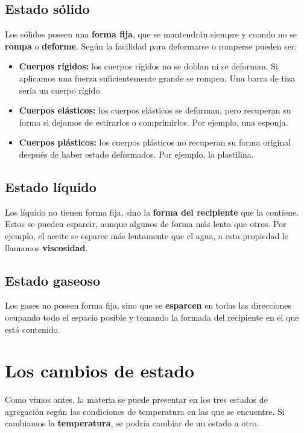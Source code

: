 \subsection{Estado sólido}

Los sólidos poseen una \textbf{forma fija}, que se mantendrán siempre y cuando no se \textbf{rompa} o \textbf{deforme}. Según la facilidad para deformarse o romperse pueden ser:

\begin{itemize}
\item \textbf{Cuerpos rígidos:} los cuerpos rígidos no se doblan ni se deforman. Si aplicamos una fuerza suficientemente grande se rompen. Una barra de tiza sería un cuerpo rígido.

\item \textbf{Cuerpos elásticos:} los cuerpos elásticos se deforman, pero recuperan su forma si dejamos de estirarlos o comprimirlos. Por ejemplo, una esponja.

\item \textbf{Cuerpos plásticos:} los cuerpos plásticos no recuperan su forma original después de haber estado deformados. Por ejemplo, la plastilina.
\end{itemize}


\subsection{Estado líquido}

Los líquido no tienen forma fija, sino la \textbf{forma del recipiente} que la contiene. Estos se pueden esparcir, aunque algunos de forma más lenta que otros. Por ejemplo, el aceite se esparce más lentamente que el agua, a esta propiedad le llamamos \textbf{viscosidad}.


\subsection{Estado gaseoso}

Los gases no poseen forma fija, sino que se \textbf{esparcen} en todas las direcciones ocupando todo el espacio posible y tomando la formada del recipiente en el que está contenido.



\section{Los cambios de estado}

Como vimos antes, la materia se puede presentar en los tres estados de agregación según las condiciones de temperatura en las que se encuentre. Si cambiamos la \textbf{temperatura}, se podría cambiar de un estado a otro.


